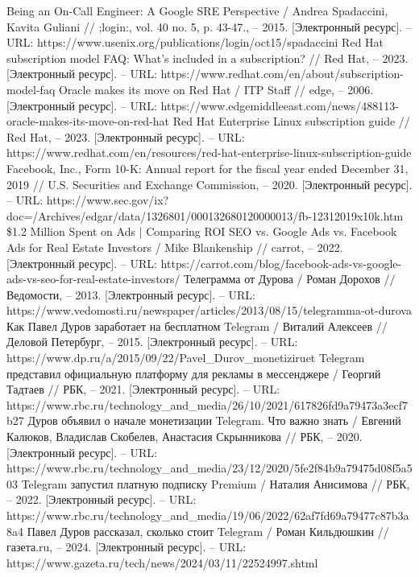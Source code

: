 \documentclass{article}
\begin{document}
\begin{thebibliography}{2}
 Being an On-Call Engineer: A Google SRE Perspective / Andrea Spadaccini, Kavita Guliani // ;login:, vol. 40 no. 5, p. 43-47., – 2015. [Электронный ресурс]. – URL: https://www.usenix.org/publications/login/oct15/spadaccini
 Red Hat subscription model FAQ: What's included in a subscription? // Red Hat, – 2023. [Электронный ресурс]. – URL: https://www.redhat.com/en/about/subscription-model-faq
 Oracle makes its move on Red Hat / ITP Staff // edge, – 2006. [Электронный ресурс]. – URL: https://www.edgemiddleeast.com/news/488113-oracle-makes-its-move-on-red-hat
 Red Hat Enterprise Linux subscription guide // Red Hat, – 2023. [Электронный ресурс]. – URL: https://www.redhat.com/en/resources/red-hat-enterprise-linux-subscription-guide
 Facebook, Inc., Form 10-K: Annual report for the fiscal year ended December 31, 2019 // U.S. Securities and Exchange Commission, – 2020. [Электронный ресурс]. – URL: https://www.sec.gov/ix?doc=/Archives/edgar/data/1326801/000132680120000013/fb-12312019x10k.htm
 \$1.2 Million Spent on Ads | Comparing ROI SEO vs. Google Ads vs. Facebook Ads for Real Estate Investors / Mike Blankenship // carrot, – 2022. [Электронный ресурс]. – URL: https://carrot.com/blog/facebook-ads-vs-google-ads-vs-seo-for-real-estate-investors/
 Телеграмма от Дурова / Роман Дорохов // Ведомости, – 2013. [Электронный ресурс]. – URL: https://www.vedomosti.ru/newspaper/articles/2013/08/15/telegramma-ot-durova
 Как Павел Дуров заработает на бесплатном Telegram / Виталий Алексеев // Деловой Петербург, – 2015. [Электронный ресурс]. – URL: https://www.dp.ru/a/2015/09/22/Pavel\_Durov\_monetiziruet
 Telegram представил официальную платформу для рекламы в мессенджере / Георгий Тадтаев // РБК, – 2021. [Электронный ресурс]. – URL: https://www.rbc.ru/technology\_and\_media/26/10/2021/617826fd9a79473a3ecf7b27
 Дуров объявил о начале монетизации Telegram. Что важно знать / Евгений Калюков, Владислав Скобелев, Анастасия Скрынникова // РБК, – 2020. [Электронный ресурс]. – URL: https://www.rbc.ru/technology\_and\_media/23/12/2020/5fe2f84b9a79475d08f5a503
 Telegram запустил платную подписку Premium / Наталия Анисимова // РБК, – 2022. [Электронный ресурс]. – URL: https://www.rbc.ru/technology\_and\_media/19/06/2022/62af7fd69a79477c87b3a8a4
 Павел Дуров рассказал, сколько стоит Telegram / Роман Кильдюшкин // газета.ru, – 2024. [Электронный ресурс]. – URL: https://www.gazeta.ru/tech/news/2024/03/11/22524997.shtml

\end{thebibliography}
\end{document}
